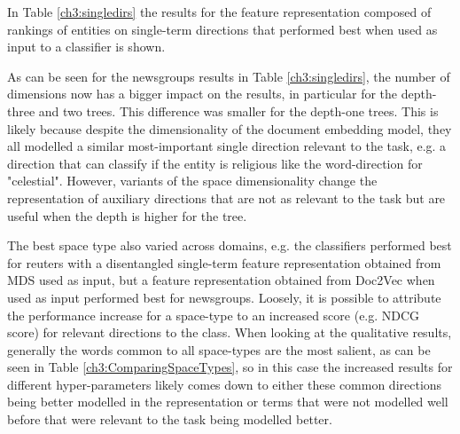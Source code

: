 In Table \ref{ch3:singledirs} the results for the feature representation composed of rankings of entities on single-term directions that performed best when used as input to a classifier is shown.



 
 As can be seen for the newsgroups results in Table \ref{ch3:singledirs}, the number of dimensions now has a bigger impact on the results, in particular for the depth-three and two trees. This difference was smaller for the depth-one trees. This is likely because despite the dimensionality of the document embedding model, they all modelled a similar most-important single direction relevant to the task, e.g. a direction that can classify if the entity is religious like the word-direction for "celestial". However, variants of the space dimensionality change the representation of auxiliary directions that are not as relevant to the task but are useful when the depth is higher for the tree.
 
 
The best space type also varied across domains, e.g. the classifiers performed best for reuters with a disentangled single-term feature representation obtained from MDS used as input, but a feature representation obtained from Doc2Vec when used as input performed best for newsgroups. Loosely, it is possible to attribute the performance increase for a space-type to an increased score (e.g. NDCG score) for relevant directions to the class. When looking at the qualitative results, generally the words common to all space-types are the most salient, as can be seen in Table \ref{ch3:ComparingSpaceTypes}, so in this case the increased results for different hyper-parameters likely comes down to either these common directions being better modelled in the representation or terms that were not modelled well before that were relevant to the task being modelled better.
 
 
